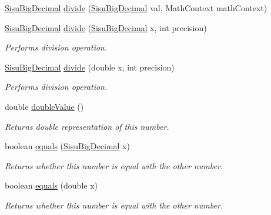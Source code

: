 \begin{DoxyCompactItemize}
\hyperlink{classcom_1_1aarrelaakso_1_1drawl_1_1_sisu_big_decimal}{Sisu\+Big\+Decimal} \hyperlink{classcom_1_1aarrelaakso_1_1drawl_1_1_sisu_big_decimal_ac1dbd016deb958fa7332bf3a777d14e2}{divide} (\hyperlink{classcom_1_1aarrelaakso_1_1drawl_1_1_sisu_big_decimal}{Sisu\+Big\+Decimal} val, Math\+Context math\+Context)
\item 
\hyperlink{classcom_1_1aarrelaakso_1_1drawl_1_1_sisu_big_decimal}{Sisu\+Big\+Decimal} \hyperlink{classcom_1_1aarrelaakso_1_1drawl_1_1_sisu_big_decimal_ae205ef47f514e99e0ca571001ad1ea69}{divide} (\hyperlink{classcom_1_1aarrelaakso_1_1drawl_1_1_sisu_big_decimal}{Sisu\+Big\+Decimal} x, int precision)
\begin{DoxyCompactList}\small\item\em Performs division operation. \end{DoxyCompactList}\item 
\hyperlink{classcom_1_1aarrelaakso_1_1drawl_1_1_sisu_big_decimal}{Sisu\+Big\+Decimal} \hyperlink{classcom_1_1aarrelaakso_1_1drawl_1_1_sisu_big_decimal_a434a75dd442a5dc4ccb8a7af48ff4728}{divide} (double x, int precision)
\begin{DoxyCompactList}\small\item\em Performs division operation. \end{DoxyCompactList}\item 
double \hyperlink{classcom_1_1aarrelaakso_1_1drawl_1_1_sisu_big_decimal_a4b69c8b90193583069b152ffa4fec2a6}{double\+Value} ()
\begin{DoxyCompactList}\small\item\em Returns double representation of this number. \end{DoxyCompactList}\item 
boolean \hyperlink{classcom_1_1aarrelaakso_1_1drawl_1_1_sisu_big_decimal_a0bec7f1090a853692b13cbf387f8b11a}{equals} (\hyperlink{classcom_1_1aarrelaakso_1_1drawl_1_1_sisu_big_decimal}{Sisu\+Big\+Decimal} x)
\begin{DoxyCompactList}\small\item\em Returns whether this number is equal with the other number. \end{DoxyCompactList}\item 
boolean \hyperlink{classcom_1_1aarrelaakso_1_1drawl_1_1_sisu_big_decimal_ac3db8159d68b7b6d5fb518ac735b788e}{equals} (double x)
\begin{DoxyCompactList}\small\item\em Returns whether this number is equal with the other number. \end{DoxyCompactList}\item 

\end{DoxyCompactItemize}
